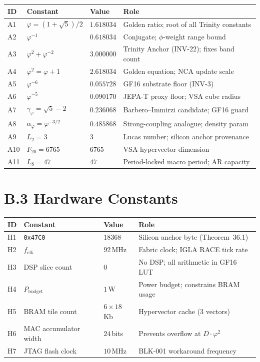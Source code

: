 \begin{longtable}[]{@{}llll@{}}
\toprule\noalign{}
ID & Constant & Value & Role \\
\midrule\noalign{}
\endhead
\bottomrule\noalign{}
\endlastfoot
A1 & $\varphi = (1+\sqrt{5})/2$ & $1.618034$ & Golden ratio; root of all Trinity constants \\
A2 & $\varphi^{-1}$ & $0.618034$ & Conjugate; $\phi$-weight range bound \\
A3 & $\varphi^2 + \varphi^{-2}$ & $3.000000$ & Trinity Anchor (INV-22); fixes band count \\
A4 & $\varphi^2 = \varphi + 1$ & $2.618034$ & Golden equation; NCA update scale \\
A5 & $\varphi^{-6}$ & $0.055728$ & GF16 substrate floor (INV-3) \\
A6 & $\varphi^{-5}$ & $0.090170$ & JEPA-T proxy floor; VSA cube radius \\
A7 & $\gamma_\varphi = \sqrt{5}-2$ & $0.236068$ & Barbero--Immirzi candidate; GF16 guard \\
A8 & $\alpha_\varphi = \varphi^{-3/2}$ & $0.485868$ & Strong-coupling analogue; density param \\
A9 & $L_2 = 3$ & $3$ & Lucas number; silicon anchor provenance \\
A10 & $F_{20} = 6765$ & $6765$ & VSA hypervector dimension \\
A11 & $L_8 = 47$ & $47$ & Period-locked macro period; AR capacity \\
\end{longtable}

\section*{B.3 Hardware Constants}
\label{app:B-hardware}

\begin{longtable}[]{@{}llll@{}}
\toprule\noalign{}
ID & Constant & Value & Role \\
\midrule\noalign{}
\endhead
\bottomrule\noalign{}
\endlastfoot
H1 & \texttt{0x47C0} & $18368$ & Silicon anchor byte (Theorem~36.1) \\
H2 & $f_{\mathrm{clk}}$ & $92$\,MHz & Fabric clock; IGLA RACE tick rate \\
H3 & DSP slice count & $0$ & No DSP; all arithmetic in GF16 LUT \\
H4 & $P_{\mathrm{budget}}$ & $1$\,W & Power budget; constrains BRAM usage \\
H5 & BRAM tile count & $6 \times 18$\,Kb & Hypervector cache (3 vectors) \\
H6 & MAC accumulator width & $24$\,bits & Prevents overflow at $D \cdot \varphi^2$ \\
H7 & JTAG flash clock & $10$\,MHz & BLK-001 workaround frequency \\
\end{longtable}

